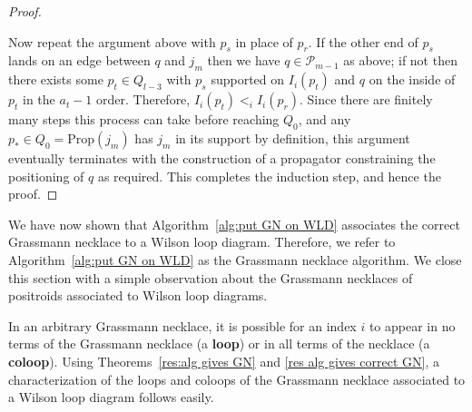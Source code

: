 \documentclass[11pt]{article}
\newcommand{\hlfix}[2]{\texthl{#1}\todo{#2}}
\newcommand{\cP}{\mathcal{P}}
\newcommand{\Prop}{\textrm{Prop}}
\theoremstyle{remark}
\theoremstyle{definition}
\begin{document}
\begin{proof}
\begin{figure}
\end{figure}
Now repeat the argument above with $p_s$ in place of $p_r$.  If the other end of $p_s$ lands on an edge between $q$ and $j_m$ then we have $q \in \cP_{m-1}$ as above; if not then there exists some $p_t \in Q_{l-3}$ with $p_s$ supported on $I_i(p_t)$ and $q$ on the inside of $p_t$ in the $a_t-1$ order. Therefore, $I_i(p_t) <_i I_i(p_r)$.
Since there are finitely many steps this process can take before reaching $Q_0$, and any $p_* \in Q_0  = \Prop(j_m)$ has $j_m$ in its support by definition, this argument eventually terminates with the construction of a propagator constraining the positioning of $q$ as required. This completes the induction step, and hence the proof.\end{proof}



We have now shown that Algorithm~\ref{alg:put GN on WLD} associates the correct Grassmann necklace to a Wilson loop diagram. Therefore, we refer to Algorithm~\ref{alg:put GN on WLD} as the Grassmann necklace algorithm. We close this section with a simple observation about the Grassmann necklaces of positroids associated to Wilson loop diagrams.


In an arbitrary Grassmann necklace, it is possible for an index $i$ to appear in no terms of the Grassmann necklace (a {\bf loop}) or in all terms of the necklace (a {\bf coloop}). Using Theorems~\ref{res:alg gives GN} and \ref{res alg gives correct GN}, a characterization of the loops and coloops of the Grassmann necklace associated to a Wilson loop diagram follows easily.
\end{document}
